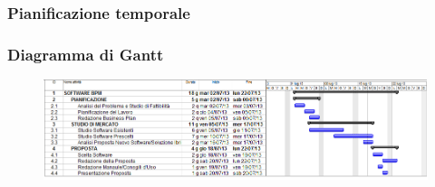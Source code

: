 \documentclass[compress,9pt,handout]{beamer}
\begin{document}
\subsubsection{Pianificazione temporale}
\begin{frame}%
\frametitle{Diagramma di Gantt}

\begin{figure}
  \includegraphics[width=\textwidth]{gantt}
\end{figure}

\begin{columns}
\end{columns}
\end{frame}
\end{document}
